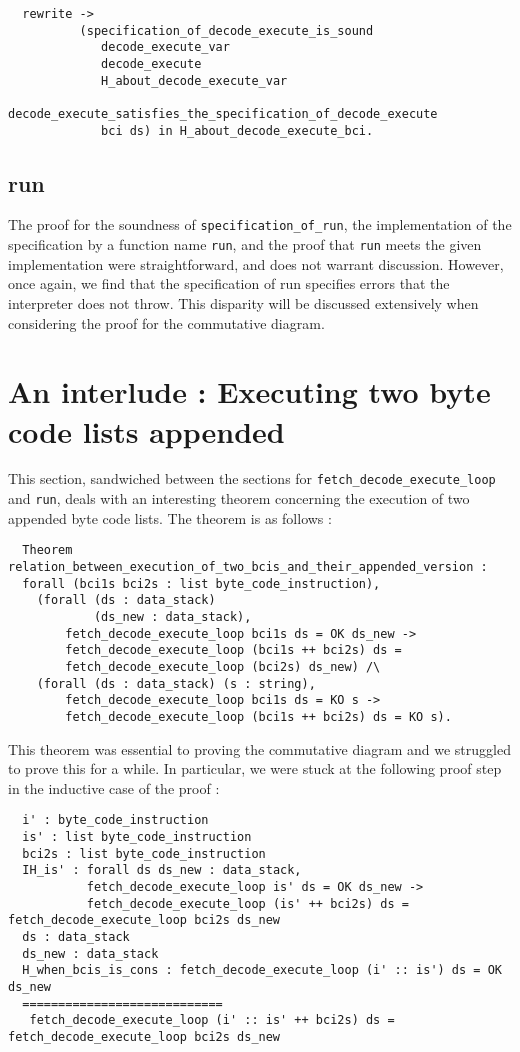 \documentclass[12pt, a4paper]{article}
\begin{document}
\begin{lstlisting}
  rewrite ->
          (specification_of_decode_execute_is_sound
             decode_execute_var
             decode_execute
             H_about_decode_execute_var
             decode_execute_satisfies_the_specification_of_decode_execute
             bci ds) in H_about_decode_execute_bci.
\end{lstlisting}


\subsection{run}
The proof for the soundness of \verb-specification_of_run-, 
the implementation of the
specification by a function name \verb-run-, and the proof that \verb-run- meets
the given implementation were straightforward, and does not warrant discussion.
 However,
once again, we find that the specification of run specifies  errors that the interpreter does
not throw. This disparity will be discussed extensively when considering the proof
for the commutative diagram.

\section{An interlude : Executing two byte code lists appended}
This section, sandwiched between the sections for \verb-fetch_decode_execute_loop- and \verb-run-, deals with an interesting theorem concerning the execution of 
two appended byte code lists. The theorem is as follows :

\begin{lstlisting}
  Theorem relation_between_execution_of_two_bcis_and_their_appended_version :
  forall (bci1s bci2s : list byte_code_instruction),
    (forall (ds : data_stack)
            (ds_new : data_stack),
        fetch_decode_execute_loop bci1s ds = OK ds_new ->
        fetch_decode_execute_loop (bci1s ++ bci2s) ds =
        fetch_decode_execute_loop (bci2s) ds_new) /\
    (forall (ds : data_stack) (s : string),
        fetch_decode_execute_loop bci1s ds = KO s ->
        fetch_decode_execute_loop (bci1s ++ bci2s) ds = KO s).
\end{lstlisting}

This theorem was essential to proving the commutative diagram and we struggled to prove
this for a while. In particular, we were stuck at the following proof step in the 
inductive case of the proof : 

\begin{lstlisting}
  i' : byte_code_instruction
  is' : list byte_code_instruction
  bci2s : list byte_code_instruction
  IH_is' : forall ds ds_new : data_stack,
           fetch_decode_execute_loop is' ds = OK ds_new ->
           fetch_decode_execute_loop (is' ++ bci2s) ds = fetch_decode_execute_loop bci2s ds_new
  ds : data_stack
  ds_new : data_stack
  H_when_bcis_is_cons : fetch_decode_execute_loop (i' :: is') ds = OK ds_new
  ============================
   fetch_decode_execute_loop (i' :: is' ++ bci2s) ds = fetch_decode_execute_loop bci2s ds_new
\end{lstlisting}
\end{document}
